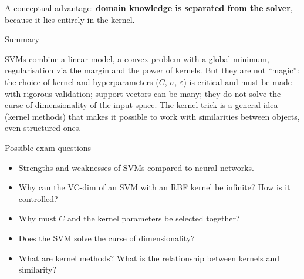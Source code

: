 A conceptual advantage: \textbf{domain knowledge is separated from the
solver}, because it lies entirely in the kernel.

\begin{boxabstract}{Summary}

SVMs combine a linear model, a convex problem with a global minimum,
regularisation via the margin and the power of kernels. But they are
not ``magic'': the choice of kernel and hyperparameters (\(C\),
\(\sigma\), \(\varepsilon\)) is critical and must be made with rigorous
validation; support vectors can be many; they do not solve the curse of
dimensionality of the input space. The kernel trick is a general idea
(kernel methods) that makes it possible to work with similarities
between objects, even structured ones.

\end{boxabstract}

\begin{boxquestion}{Possible exam questions}

\begin{itemize}
\tightlist
\item
  Strengths and weaknesses of SVMs compared to neural networks.
\item
  Why can the VC-dim of an SVM with an RBF kernel be infinite? How is
  it controlled?
\item
  Why must \(C\) and the kernel parameters be selected together?
\item
  Does the SVM solve the curse of dimensionality?
\item
  What are kernel methods? What is the relationship between kernels and
  similarity?
\end{itemize}

\end{boxquestion}
